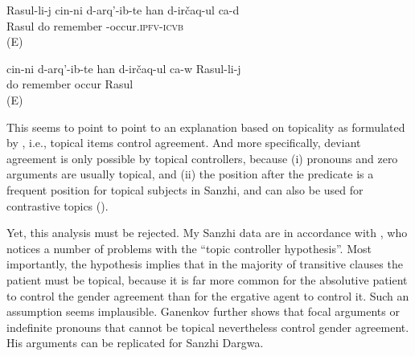 \begin{exe}
	\ex	\label{ex:Rasul remembers what he had done@X}
	\begin{xlist}
		\ex	\label{ex:Rasul remembers what he had done@c}
		\gll	Rasul-li-j	cin-ni	d-arq'-ib-te	han d-irčaq-ul ca-d\\
			Rasul		do 	remember -occur.\textsc{ipfv-icvb} \\
		\glt	{} (E)

		\ex	\label{ex:Rasul remembers what he had done@d}
		\gll	cin-ni	d-arq'-ib-te	han d-irčaq-ul ca-w	Rasul-li-j\\
				do 	remember occur 	Rasul\\
		\glt	{} (E)
	\end{xlist}
\end{exe}

This seems to point to point to an explanation based on topicality as formulated by \citet{Sumbatova.Lander2014}, i.e., topical items control agreement. And more specifically, deviant agreement is only possible by topical controllers, because (i) pronouns and zero arguments are usually topical, and (ii) the position after the predicate is a frequent position for topical subjects in Sanzhi, and can also be used for contrastive topics (). 

Yet, this analysis must be rejected. My Sanzhi data are in accordance with \citet{GanenkovForthcoming}, who notices a number of problems with the ``topic controller hypothesis''. Most importantly, the hypothesis implies that in the majority of transitive clauses the patient must be topical, because it is far more common for the absolutive patient to control the gender agreement than for the ergative agent to control it. Such an assumption seems implausible. Ganenkov further shows that focal arguments or indefinite pronouns that cannot be topical nevertheless control gender agreement. His arguments can be replicated for Sanzhi Dargwa. 


